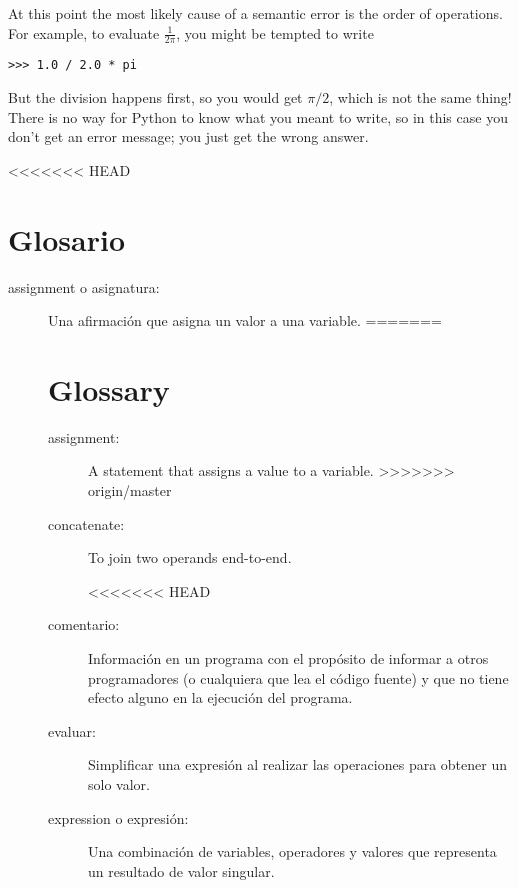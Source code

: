\begin{ex}
At this point the most likely cause of a semantic error is
the order of operations.  For example, to evaluate $\frac{1}{2 \pi}$,
you might be tempted to write

\beforeverb
\begin{verbatim}
>>> 1.0 / 2.0 * pi
\end{verbatim}
\afterverb
%
But the division happens first, so you would get $\pi / 2$, which
is not the same thing!  There is no way for Python
to know what you meant to write, so in this case you don't
get an error message; you just get the wrong answer.

<<<<<<< HEAD


\section{Glosario}

\begin{description}

\item[assignment o asignatura:]  Una afirmaci\'on que asigna un valor a una variable.
=======


\section{Glossary}

\begin{description}

\item[assignment:]  A statement that assigns a value to a variable.
>>>>>>> origin/master

\item[concatenate:]  To join two operands end-to-end.

<<<<<<< HEAD
\item[comentario:]  Informaci\'on en un programa con el prop\'osito de informar a otros programadores (o cualquiera que lea el c\'odigo fuente) y que no tiene efecto alguno en la ejecuci\'on del programa.

\item[evaluar:]  Simplificar una expresi\'on al realizar las operaciones para obtener un solo valor.

\item[expression o expresi\'on:]  Una combinaci\'on de variables, operadores y valores que
representa un resultado de valor singular.


\end{description}
\end{description}
\end{ex}
